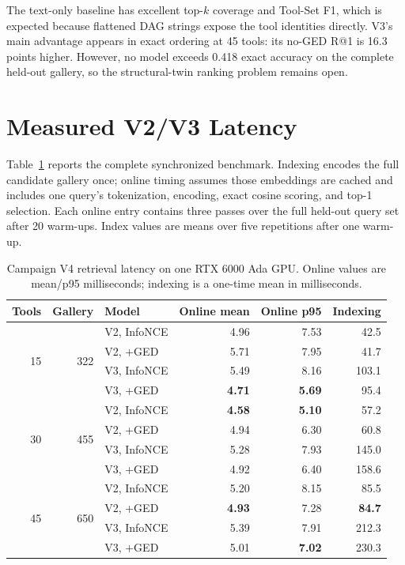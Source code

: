 \documentclass{article}
\begin{document}
The text-only baseline has excellent top-$k$ coverage and Tool-Set F1, which is expected because flattened DAG strings expose the tool identities directly. V3's main advantage appears in exact ordering at 45 tools: its no-GED R@1 is 16.3 points higher. However, no model exceeds 0.418 exact accuracy on the complete held-out gallery, so the structural-twin ranking problem remains open.

\section{Measured V2/V3 Latency}
\label{sec:latency-results}

Table~\ref{tab:latency-results} reports the complete synchronized benchmark. Indexing encodes the full candidate gallery once; online timing assumes those embeddings are cached and includes one query's tokenization, encoding, exact cosine scoring, and top-1 selection. Each online entry contains three passes over the full held-out query set after 20 warm-ups. Index values are means over five repetitions after one warm-up.

\begin{table}[h]
\caption{Campaign V4 retrieval latency on one RTX 6000 Ada GPU. Online values are mean/p95 milliseconds; indexing is a one-time mean in milliseconds.}
\label{tab:latency-results}
\centering
\scriptsize
\begin{tabular}{@{}rrlrrr@{}}
\toprule
Tools & Gallery & Model & Online mean & Online p95 & Indexing \\
\midrule
\multirow{4}{*}{15} & \multirow{4}{*}{322}
 & V2, InfoNCE     & 4.96 & 7.53 & 42.5 \\
 & & V2, +GED        & 5.71 & 7.95 & 41.7 \\
 & & V3, InfoNCE     & 5.49 & 8.16 & 103.1 \\
 & & V3, +GED        & \textbf{4.71} & \textbf{5.69} & 95.4 \\
\midrule
\multirow{4}{*}{30} & \multirow{4}{*}{455}
 & V2, InfoNCE     & \textbf{4.58} & \textbf{5.10} & 57.2 \\
 & & V2, +GED        & 4.94 & 6.30 & 60.8 \\
 & & V3, InfoNCE     & 5.28 & 7.93 & 145.0 \\
 & & V3, +GED        & 4.92 & 6.40 & 158.6 \\
\midrule
\multirow{4}{*}{45} & \multirow{4}{*}{650}
 & V2, InfoNCE     & 5.20 & 8.15 & 85.5 \\
 & & V2, +GED        & \textbf{4.93} & 7.28 & \textbf{84.7} \\
 & & V3, InfoNCE     & 5.39 & 7.91 & 212.3 \\
 & & V3, +GED        & 5.01 & \textbf{7.02} & 230.3 \\
\bottomrule
\end{tabular}
\end{table}
\end{document}
